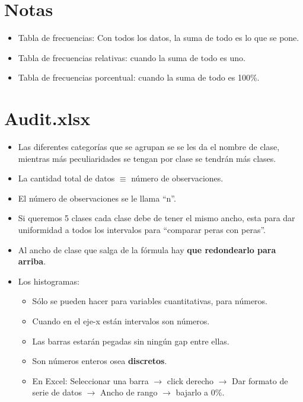 \section{Notas}
\begin{itemize}
    \item Tabla de frecuencias: Con todos los datos, la suma de todo es lo que se pone. 
    \item Tabla de frecuencias relativas: cuando la suma de todo es uno. 
    \item Tabla de frecuencias porcentual: cuando la suma de todo es 100\%.
\end{itemize}


\section{Audit.xlsx}
\begin{itemize}
    \item Las diferentes categorías que se agrupan se se les da el nombre de clase, mientras más peculiaridades se tengan por clase se tendrán más clases.
    \item La cantidad total de datos $\equiv$ número de observaciones.
    \item El número de observaciones se le llama ``n''.
    \item Si queremos 5 clases cada clase debe de tener el mismo ancho, esta para dar uniformidad a todos los intervalos para ``comparar peras con peras''.
    \item Al ancho de clase que salga de la fórmula hay \textbf{que redondearlo para arriba}.
    \item Los histogramas:
        \begin{itemize}
            \item Sólo se pueden hacer para variables cuantitativas, para números.
            \item Cuando en el eje-x están intervalos son números.
            \item Las barras estarán pegadas sin ningún gap entre ellas.
            \item Son números enteros osea \textbf{discretos}.
            \item En Excel: Seleccionar una barra $\rightarrow$ click derecho $\rightarrow$ Dar formato de serie de datos $\rightarrow$ Ancho de rango $\rightarrow$ bajarlo a 0\%.
        \end{itemize}
\end{itemize}
